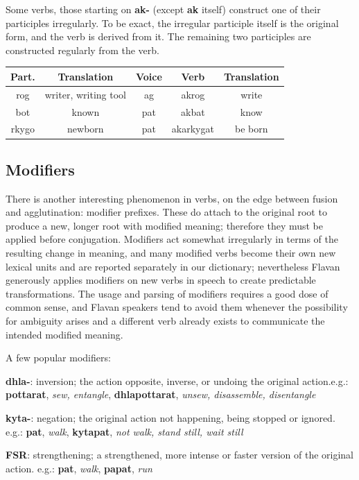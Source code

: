 \documentclass[10pt,oneside]{memoir}
\begin{document}
\begin{multicols}{2}
Some verbs, those starting on \textbf{ak-} (except \textbf{ak} itself) construct one of their participles irregularly. To be exact, the irregular participle itself is the original form, and the verb is derived from it. The remaining two participles are constructed regularly from the verb.

{\small
\begin{tabular}[]{*{5}{c}}
    Part. & Translation & Voice & Verb & Translation\\
    \hline
    rog & writer, writing tool & ag & akrog & write\\
    bot & known                 & pat & akbat & know\\
    rkygo & newborn & pat & akarkygat & be born\\
   
\end{tabular}
}

\subsection{Modifiers}

There is another interesting phenomenon in verbs, on the edge between fusion and agglutination: modifier prefixes. These do attach to the original root to produce a new, longer root with modified meaning; therefore they must be applied before conjugation. Modifiers act somewhat irregularly in terms of the resulting change in meaning, and many modified verbs become their own new lexical units and are reported separately in our dictionary; nevertheless Flavan generously applies modifiers on new verbs in speech to create predictable transformations. The usage and parsing of modifiers requires a good dose of common sense, and Flavan speakers tend to avoid them whenever the possibility for ambiguity arises and a different verb already exists to communicate the intended modified meaning.

A few popular modifiers:

\textbf{dhla-}: inversion; the action opposite, inverse, or undoing the original action.e.g.: \textbf{pottarat}, \emph{sew, entangle}, \textbf{dhlapottarat}, \emph{unsew, disassemble, disentangle}

\textbf{kyta-}: negation; the original action not happening, being stopped or ignored. e.g.: \textbf{pat}, \emph{walk}, \textbf{kytapat}, \emph{not walk, stand still, wait still}

\textbf{FSR}: strengthening; a strengthened, more intense or faster version of the original action. e.g.: \textbf{pat}, \emph{walk}, \textbf{papat}, \emph{run}
		

\end{multicols}
\end{document}
